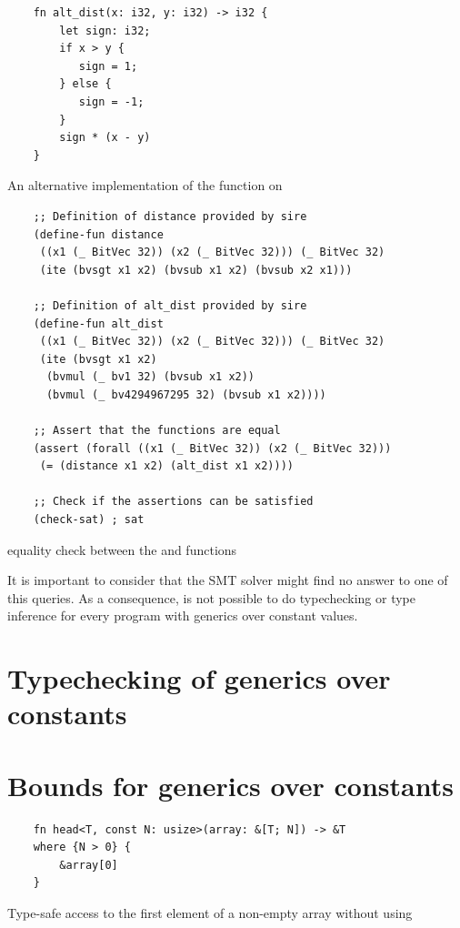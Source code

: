 \begin{listing}[h]
    \begin{verbatim}
    fn alt_dist(x: i32, y: i32) -> i32 {
        let sign: i32; 
        if x > y {
           sign = 1;
        } else {
           sign = -1;
        }
        sign * (x - y)
    }
    \end{verbatim}
    \caption{An alternative implementation of the  function on }
  \label{lst:alt_distance}
\end{listing}

\begin{listing}[h]
    \begin{verbatim}
    ;; Definition of distance provided by sire
    (define-fun distance 
     ((x1 (_ BitVec 32)) (x2 (_ BitVec 32))) (_ BitVec 32) 
     (ite (bvsgt x1 x2) (bvsub x1 x2) (bvsub x2 x1)))

    ;; Definition of alt_dist provided by sire
    (define-fun alt_dist 
     ((x1 (_ BitVec 32)) (x2 (_ BitVec 32))) (_ BitVec 32) 
     (ite (bvsgt x1 x2) 
      (bvmul (_ bv1 32) (bvsub x1 x2)) 
      (bvmul (_ bv4294967295 32) (bvsub x1 x2))))
    
    ;; Assert that the functions are equal
    (assert (forall ((x1 (_ BitVec 32)) (x2 (_ BitVec 32))) 
     (= (distance x1 x2) (alt_dist x1 x2)))) 

    ;; Check if the assertions can be satisfied
    (check-sat) ; sat
    \end{verbatim}
    \caption{equality check between the  and  functions}
  \label{lst:func_equality}
\end{listing}

It is important to consider that the SMT solver might find no answer to one of
this queries. As a consequence, is not possible to do typechecking or type
inference for every program with generics over constant values.

\section{Typechecking of generics over constants}

\section{Bounds for generics over constants}

\begin{listing}[h]
	\begin{verbatim}
    fn head<T, const N: usize>(array: &[T; N]) -> &T
    where {N > 0} {
        &array[0]
    }
    \end{verbatim}
    \caption{Type-safe access to the first element of a non-empty array without using }
  \label{lst:head_const_generics}
\end{listing}

